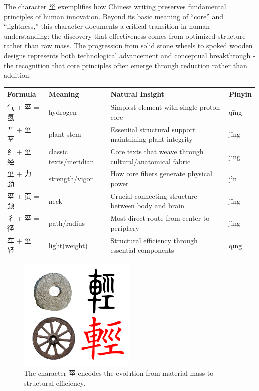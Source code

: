 \documentclass[11pt,letterpaper]{article}
\begin{document}
The character 坙 exemplifies how Chinese writing preserves fundamental
principles of human innovation. Beyond its basic meaning of ``core'' and
``lightness,'' this character documents a critical transition in human
understanding: the discovery that effectiveness comes from optimized
structure rather than raw mass. The progression from solid stone wheels
to spoked wooden designs represents both technological advancement and
conceptual breakthrough - the recognition that core principles often
emerge through reduction rather than addition.

\begin{longtable}{|p{3cm}|p{3cm}|p{6cm}|p{2cm}|}
\hline
\textbf{Formula} & \textbf{Meaning} & \textbf{Natural Insight} & \textbf{Pinyin} \\
\hline
气 + 坙 = 氢 & hydrogen & Simplest element with single proton core &
qīng \\
\hline
艹 + 坙 = 茎 & plant stem & Essential structural support maintaining
plant integrity & jīng \\
\hline
纟 + 坙 = 经 & classic texts/meridian & Core texts that weave through
cultural/anatomical fabric & jīng \\
\hline
坙 + 力 = 劲 & strength/vigor & How core fibers generate physical power
& jìn \\
\hline
坙 + 页 = 颈 & neck & Crucial connecting structure between body and
brain & jǐng \\
\hline
彳 + 坙 = 径 & path/radius & Most direct route from center to periphery
& jìng \\
\hline
车 + 坙 = 轻 & light(weight) & Structural efficiency through essential
components & qīng \\
\hline
\end{longtable}

\begin{figure}
\centering
\includegraphics[width=0.5\textwidth]{./images/zi_stem.png}
\caption{The character 坙 encodes the evolution from material mass to
structural efficiency.}
\end{figure}
\end{document}
